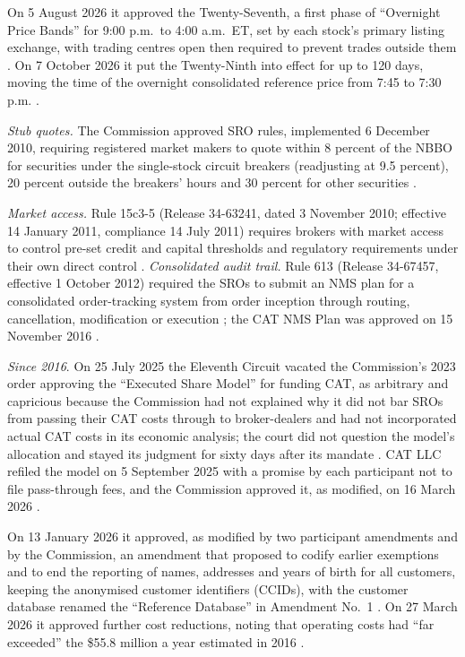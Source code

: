 \begin{qfrule}
On 5 August 2026 it approved the Twenty-Seventh, a first phase of ``Overnight Price Bands'' for 9:00 p.m.\ to 4:00 a.m.\ ET, set by each stock's primary listing exchange, with trading centres open then required to prevent trades outside them \citep[91~FR 51515]{fr-2026-16201}. On 7 October 2026 it put the Twenty-Ninth into effect for up to 120 days, moving the time of the overnight consolidated reference price from 7:45 to 7:30 p.m. \citep[91~FR 65016]{fr-2026-20799}.

\emph{Stub quotes.} The Commission approved SRO rules, implemented 6 December 2010, requiring registered market makers to quote within 8 percent of the NBBO for securities under the single-stock circuit breakers (readjusting at 9.5 percent), 20 percent outside the breakers' hours and 30 percent for other securities \citep[Release 34-63255]{sec-34-63255}.

\emph{Market access.} Rule 15c3-5 (Release 34-63241, dated 3 November 2010; effective 14 January 2011, compliance 14 July 2011) requires brokers with market access to control pre-set credit and capital thresholds and regulatory requirements under their own direct control \citep[paras.~(b)--(c)]{cfr-240-15c3-5}. \emph{Consolidated audit trail.} Rule 613 (Release 34-67457, effective 1 October 2012) required the SROs to submit an NMS plan for a consolidated order-tracking system from order inception through routing, cancellation, modification or execution \citep[p.~45722, summary and dates]{sec-34-67457}; the CAT NMS Plan was approved on 15 November 2016 \citep[Release 34-79318]{sec-34-79318}.

\emph{Since 2016}. On 25 July 2025 the Eleventh Circuit vacated the Commission's 2023 order approving the ``Executed Share Model'' for funding CAT, as arbitrary and capricious because the Commission had not explained why it did not bar SROs from passing their CAT costs through to broker-dealers and had not incorporated actual CAT costs in its economic analysis; the court did not question the model's allocation and stayed its judgment for sixty days after its mandate \citep[secs.~I--II]{fr-2026-05350}. CAT LLC refiled the model on 5 September 2025 with a promise by each participant not to file pass-through fees, and the Commission approved it, as modified, on 16 March 2026 \citep[sec.~I, 91~FR 13410]{fr-2026-05350}.

On 13 January 2026 it approved, as modified by two participant amendments and by the Commission, an amendment that proposed to codify earlier exemptions and to end the reporting of names, addresses and years of birth for all customers, keeping the anonymised customer identifiers (CCIDs), with the customer database renamed the ``Reference Database'' in Amendment No.~1 \citep[sec.~I and nn.~25--38]{fr-2026-00762}. On 27 March 2026 it approved further cost reductions, noting that operating costs had ``far exceeded'' the \$55.8 million a year estimated in 2016 \citep[secs.~I--II, 91~FR 16284]{fr-2026-06255}.


\end{qfrule}
